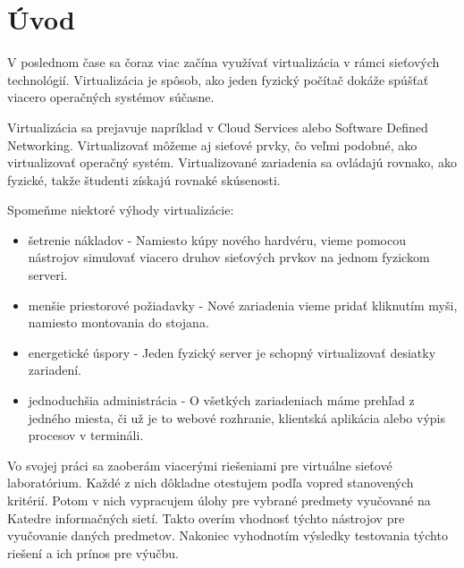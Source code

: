 \chapter*{Úvod}

V poslednom čase sa čoraz viac začína využívať virtualizácia v rámci sieťových technológií. Virtualizácia je spôsob, ako jeden fyzický počítač dokáže spúšťať viacero operačných systémov súčasne.

Virtualizácia sa prejavuje napríklad v Cloud Services alebo Software Defined Networking. Virtualizovať môžeme aj sieťové prvky, čo veľmi podobné, ako virtualizovať operačný systém. Virtualizované zariadenia sa ovládajú rovnako, ako fyzické, takže študenti získajú rovnaké skúsenosti.

Spomeňme niektoré výhody virtualizácie:
\begin{itemize}
\item šetrenie nákladov - Namiesto kúpy nového hardvéru, vieme pomocou nástrojov simulovať viacero druhov sieťových prvkov na jednom fyzickom serveri.
\item menšie priestorové požiadavky - Nové zariadenia vieme pridať kliknutím myši, namiesto montovania do stojana.
\item energetické úspory - Jeden fyzický server je schopný virtualizovať desiatky zariadení.
\item jednoduchšia administrácia - O všetkých zariadeniach máme prehľad z jedného miesta, či už je to webové rozhranie, klientská aplikácia alebo výpis procesov v termináli.
\end{itemize}

Vo svojej práci sa zaoberám viacerými riešeniami pre virtuálne sieťové laboratórium. Každé z nich dôkladne otestujem podľa vopred stanovených kritérií. Potom v nich vypracujem úlohy pre vybrané predmety vyučované na Katedre informačných sietí. Takto overím vhodnosť týchto nástrojov pre vyučovanie daných predmetov. Nakoniec vyhodnotím výsledky testovania týchto riešení a ich prínos pre výučbu.